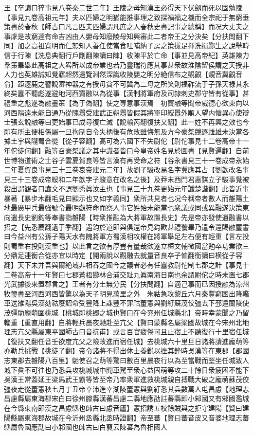 王【卒讀曰猝事見八卷秦二世二年】王陵之母知漢王必得天下伏劔而死以固勉陵【事見九卷高祖元年】夫以匹婦之明猶能推事理之致探禍福之機而全宗祀于無窮垂策書於春秋【師古曰凡言匹夫匹婦謂凡庶之人春秋史書記事之總稱】而况大丈夫之事虖是故窮達有命吉凶由人嬰母知廢陵母知興審此二者帝王之分決矣【分扶問翻下同】加之高祖寛明而仁恕知人善任使當食吐哺納子房之策拔足揮洗揖酈生之說舉韓信于行陳【洗息典翻行戶剛翻陳讀曰陣】收陳平於亡命【事並見高帝紀】英雄陳力羣策畢舉此高祖之大畧所以成帝業也若乃靈瑞符應其事甚衆故淮隂留侯謂之天授非人力也英雄誠知覺寤超然遠覽淵然深識收陵嬰之明分絶信布之覬覦【覬音冀覦音俞】距逐鹿之瞽說審神器之有授毋貪不可冀為二母之所笑則福祚流于子孫天禄其永終矣囂不聽彪遂避地河西竇融以為從事【漢制將軍府及司隸刺史郡守皆有從事】甚禮重之彪遂為融畫策【為于偽翻】使之專意事漢焉　初竇融等聞帝威德心欲東向以河西隔遠未能自通乃從隗囂受建武正朔囂皆假其將軍印綬囂外順人望内懷異心使辯士張玄說融等曰更始事已成尋復亡滅【說輸芮翻復扶又翻】此一姓不再興之效也今即有所主便相係屬一旦拘制自令失柄後有危敗雖悔無及方今豪桀競逐雌雄未決當各據土宇與隴蜀合從【從子容翻】高可為六國下不失尉佗【尉佗事見十二卷高帝十一年佗徒何翻】融等召豪桀議之其中識者皆曰今皇帝姓名見於圖書【見賢遍翻】自前世博物道術之士谷子雲夏賀良等皆言漢有再受命之符【谷永書見三十一卷成帝永始二年夏賀良事見三十三卷哀帝建元二年】故劉子駿改易名字冀應其占【劉歆改名事見三十三卷成帝綏和二年歆字子駿意在改名之後】及莽末西門君惠謀立子駿事覺被殺出謂觀者曰䜟文不誤劉秀眞汝主也【事見三十九卷更始元年讖楚諧翻】此皆近事暴著【暴步木翻毛見曰顯示也又如字義同】衆所共見者也况今稱帝者數人而雒陽土地最廣甲兵最強號令最明觀符命而察人事它姓殆未能當也衆議或同或異融遂決策東向遣長史劉鈞等奉書詣雒陽【時衆推融為大將軍故置長史】先是帝亦發使遺融書以招之【先悉薦翻遺于季翻】遇鈞於道即與俱還帝見鈞歡甚禮饗畢乃遣令還賜融璽書曰今益州有公孫子陽天水有隗將軍方蜀漢相攻權在將軍舉足左右便有輕重【言左投則蜀重右投則漢重也】以此言之欲有厚豈有量哉欲遂立桓文輔微國當勉卒功業欲三分鼎足連衡合從亦宜以時定【開兩說以觀融去就量音良卒子恤翻衡讀曰横從子容翻】天下未并吾與爾絶域非相吞之國今之議者必有任囂教尉佗制七郡之計【事見十二卷高帝十一年賢曰七郡蒼梧鬰林合浦交趾九眞南海日南也余謂尉佗之時未置七郡光武據後來置郡言之】王者有分土無分民【分扶問翻】自適己事而已因授融為涼州牧璽書至河西河西皆驚以為天子明見萬里之外　朱祜急攻黎丘六月秦豐窮困出降轞車送雒陽吳漢劾祜廢詔命受豐降上誅豐不罪祜董憲與劉紆蘇茂佼彊去下邳還蘭陵使茂彊助龐萌圍桃城【桃城即桃郷之城也賢曰在今兖州任城縣北】帝時幸蒙聞之乃留輜重【重直用翻】自將輕兵晨夜馳赴至亢父【賢曰蒙縣名屬梁國故城在今宋州北地理志亢父縣屬東平國師古曰音抗甫】或言百官疲倦可且止宿上不聽復行十里宿任城【復扶又翻任音壬欲度亢父之險故進而宿任城】去桃城六十里旦日諸將請進龐萌等亦勒兵挑戰【挑徒了翻】帝令諸將不得出休士養鋭以挫其鋒時吳漢等在東郡【郡國志東郡去雒陽八百里】馳使召之萌等驚曰數百里晨夜行以為至當戰而堅坐任城致人城下眞不可往也乃悉兵攻桃城城中聞車駕至衆心益固萌等攻二十餘日衆疲困不能下吳漢王常蓋延王梁馬武王霸等皆至帝乃率衆軍進救桃城親自搏戰大破之龐萌蘇茂佼彊夜走從董憲秋七月丁丑帝幸沛進幸湖陵董憲與劉紆悉其兵數萬人屯昌慮【地理志昌慮縣屬東海郡宋白曰徐州滕縣漢蕃昌慮二縣地應劭註蕃縣即小邾國又有邾國濫城在今縣東南即漢之昌慮縣也師古曰慮音廬】憲招誘五校餘賊與之拒守建陽【賢曰建陽縣屬東海郡故城在今沂州丞縣北丞時證翻】帝至蕃【賢曰蕃音皮又音婆地理志蕃縣屬魯國應劭曰小邾國也師古曰白裒云陳蕃為魯相國人